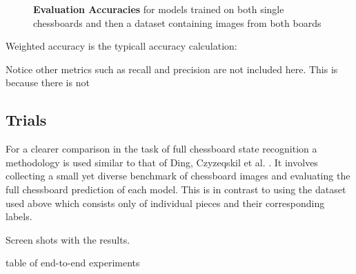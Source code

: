 \begin{figure}[h]
\caption{\textbf{Evaluation Accuracies} for models trained on both single chessboards and then a dataset containing images from both boards}
\label{table:results}
\end{figure}

Weighted accuracy is the typicall accuracy calculation:

Notice other metrics such as recall and precision are not included here.  This is because there is not

\subsection{Trials}
For a clearer comparison in the task of full chessboard state recognition a methodology is used similar
to that of Ding, Czyzeqskil et al. \cite{Ding2016ChessVisionC, heatmap}.  It involves collecting a small yet diverse benchmark of chessboard images
and evaluating the full chessboard prediction of each model.  This is in contrast to using the dataset used above which consists only of individual 
pieces and their corresponding labels.


Screen shots with the results.

table of end-to-end experiments

